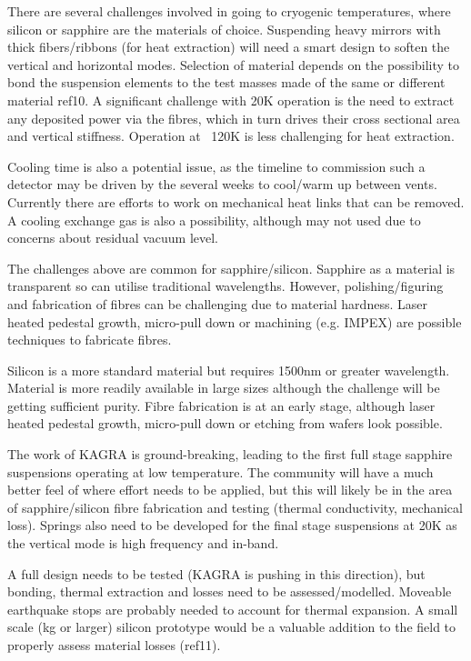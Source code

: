 There are several challenges involved in going to cryogenic temperatures, where silicon or sapphire are the materials of choice.
Suspending heavy mirrors with thick fibers/ribbons (for heat extraction) will need a smart design to soften the vertical and horizontal modes. Selection of material depends on the possibility to bond the suspension elements to the test masses made of the same or different material ref10. A significant challenge with 20K operation is the need to extract any deposited power via the fibres, which in turn drives their cross sectional area and vertical stiffness. Operation at ~120K is less challenging for heat extraction.

Cooling time is also a potential issue, as the timeline to commission such a detector may be driven by the several weeks to cool/warm up between vents. Currently there are efforts to work on mechanical heat links that can be removed. A cooling exchange gas is also a possibility, although may not used due to concerns about residual vacuum level.

The challenges above are common for sapphire/silicon. Sapphire as a material is transparent so can utilise traditional wavelengths. However, polishing/figuring and fabrication of fibres can be challenging due to material hardness. Laser heated pedestal growth, micro-pull down or machining (e.g. IMPEX) are possible techniques to fabricate fibres.

Silicon is a more standard material but requires 1500nm or greater wavelength. Material is more readily available in large sizes although the challenge will be getting sufficient purity. Fibre fabrication is at an early stage, although laser heated pedestal growth, micro-pull down or etching from wafers look possible.

The work of KAGRA is ground-breaking, leading to the first full stage sapphire suspensions operating at low temperature. The community will have a much better feel of where effort needs to be applied, but this will likely be in the area of sapphire/silicon fibre fabrication and testing (thermal conductivity, mechanical loss). Springs also need to be developed for the final stage suspensions at 20K as the vertical mode is high frequency and in-band.

A full design needs to be tested (KAGRA is pushing in this direction), but bonding, thermal extraction and losses need to be assessed/modelled. Moveable earthquake stops are probably needed to account for thermal expansion. A small scale (kg or larger) silicon prototype would be a valuable addition to the field to properly assess material losses (ref11).

